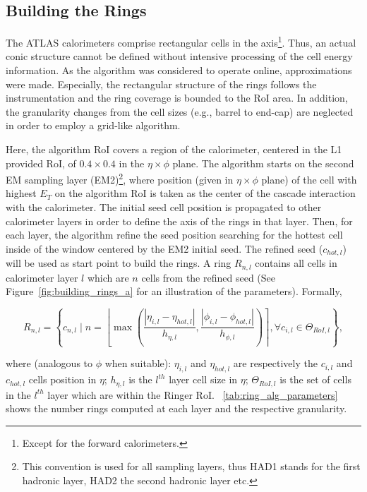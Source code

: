 \subsection{Building the Rings}\label{top:algorithm}

The ATLAS calorimeters comprise rectangular cells in the
\etaphi axis\footnote{Except for the forward calorimeters.}. Thus, an actual conic structure cannot be defined
without intensive processing of the cell energy information. As the algorithm was
considered to operate online, approximations were  made. Especially, the rectangular structure of
the rings follows the instrumentation and the ring coverage is bounded to the RoI area. In addition, the granularity changes from the cell sizes (e.g., barrel to end-cap) are neglected in order to employ a
grid-like algorithm.


Here, the algorithm RoI covers a
region of the calorimeter, centered in the L1 provided RoI, of
$0.4\times0.4$ in the $\eta\times\phi$ plane. The algorithm
starts on the second EM sampling layer (EM2)\footnote{This convention is used for all sampling layers, thus HAD1 stands for the first hadronic layer, HAD2 the second hadronic layer etc.}, where position (given in $\eta\times\phi$ plane) of the cell with
highest $E_T$ on the algorithm RoI is taken as the center of the cascade
interaction with the calorimeter. The initial seed cell position is propagated to other calorimeter layers in order to define the axis of the rings in that layer. Then, for each layer, the algorithm refine the seed position searching for the hottest cell inside of the window centered by the EM2 initial seed. The refined seed ($c_{hot,l}$) will be used as start point to build the rings. A ring $R_{n,l}$ contains all cells in calorimeter layer $l$ which are $n$ cells from the refined seed (See Figure~\ref{fig:building_rings_a} for an illustration of the parameters). Formally,


\begin{equation}
R_{n,l} = \left\{c_{n,l} \mid n = \left\lfloor \max{\left( 
\frac{| \eta_{i,l} - \eta_{hot,l} |}{h_{\eta,l}}, 
\frac{| \phi_{i,l} - \phi_{hot,l} |}{h_{\phi,l}} 
\right)} \right\rceil, 
\forall c_{i,l} \in
\Theta_{RoI,l}
\right\},
\end{equation}



\noindent where (analogous to $\phi$ when suitable): $\eta_{i,l}$
and $\eta_{hot,l}$ are respectively the $c_{i,l}$ and $c_{hot,l}$
cells position in $\eta$; $h_{\eta,l}$ is the $l^{th}$ layer cell size in $\eta$; $\Theta_{RoI,l}$ is the set of cells
in the $l^{th}$ layer which are within the Ringer RoI.
\tablename~\ref{tab:ring_alg_parameters} shows the number rings computed at each layer and the respective granularity.


